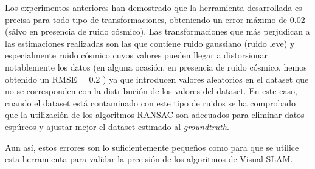 Los experimentos anteriores han demostrado que la herramienta desarrollada es precisa para todo tipo de transformaciones, obteniendo un error máximo de 0.02 (sálvo en presencia de ruido cósmico). Las transformaciones que más perjudican a las estimaciones realizadas son las que contiene ruido gaussiano (ruido leve) y especialmente ruido cósmico cuyos valores pueden llegar a distorsionar notablemente los datos (en alguna ocasión, en presencia de ruido cósmico, hemos obtenido un RMSE = 0.2 ) ya que introducen valores aleatorios en el dataset que no se corresponden con la distribución de los valores del dataset. En este caso, cuando el dataset está contaminado con este tipo de ruidos se ha comprobado que la utilización de los algoritmos RANSAC son adecuados para eliminar datos espúreos y ajustar mejor el dataset estimado al \textit{groundtruth}.

Aun así, estos errores son lo suficientemente pequeños como para que se utilice esta herramienta para validar la precisión de los algoritmos de Visual SLAM.



\clearpage
\newpage














